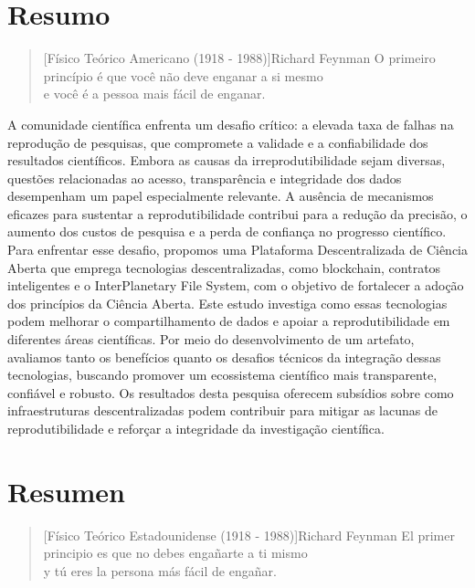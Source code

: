 \documentclass[final]{rc-book-2.14}
\begin{document}
\chapter{Resumo}
\label{chp:general-abstract:portuguese}

\begin{quotation}[Físico Teórico Americano (1918 - 1988)]{Richard Feynman}
    O primeiro princípio é que você não deve enganar a si mesmo \\ e você é a pessoa mais fácil de enganar.
\end{quotation}

\drop A comunidade científica enfrenta um desafio crítico: a elevada taxa de falhas na reprodução de pesquisas, que compromete a validade e a confiabilidade dos resultados científicos. Embora as causas da irreprodutibilidade sejam diversas, questões relacionadas ao acesso, transparência e integridade dos dados desempenham um papel especialmente relevante. A ausência de mecanismos eficazes para sustentar a reprodutibilidade contribui para a redução da precisão, o aumento dos custos de pesquisa e a perda de confiança no progresso científico. Para enfrentar esse desafio, propomos uma Plataforma Descentralizada de Ciência Aberta que emprega tecnologias descentralizadas, como blockchain, contratos inteligentes e o InterPlanetary File System, com o objetivo de fortalecer a adoção dos princípios da Ciência Aberta. Este estudo investiga como essas tecnologias podem melhorar o compartilhamento de dados e apoiar a reprodutibilidade em diferentes áreas científicas. Por meio do desenvolvimento de um artefato, avaliamos tanto os benefícios quanto os desafios técnicos da integração dessas tecnologias, buscando promover um ecossistema científico mais transparente, confiável e robusto. Os resultados desta pesquisa oferecem subsídios sobre como infraestruturas descentralizadas podem contribuir para mitigar as lacunas de reprodutibilidade e reforçar a integridade da investigação científica.


\chapter{Resumen}
\label{chp:general-abstract:spanish}

\begin{quotation}[Físico Teórico Estadounidense (1918 - 1988)]{Richard Feynman}
    El primer principio es que no debes engañarte a ti mismo \\ y tú eres la persona más fácil de engañar.
\end{quotation}
\end{document}
